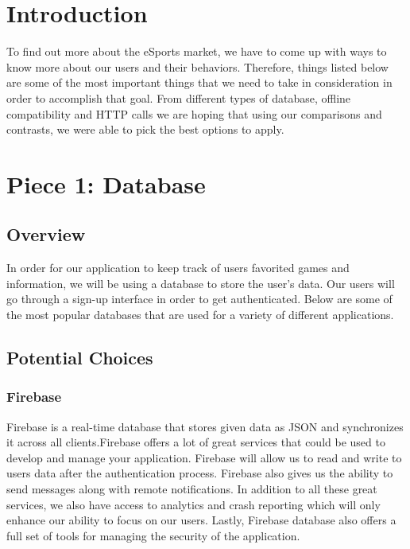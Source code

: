 \documentclass[onecolumn, draftclsnofoot,10pt, compsoc]{IEEEtran}
\begin{document}
\newpage
{}
\tableofcontents
\clearpage

\section{Introduction}
To find out more about the eSports market, we have to come up with ways to know more about our users and their behaviors. Therefore, things listed below are some of the most important things that we need to take in consideration in order to accomplish that goal. From different types of database, offline compatibility and HTTP calls we are hoping that using our comparisons and contrasts, we were able to pick the best options to apply. 

\section{Piece 1: Database}
\subsection{Overview}
In order for our application to keep track of users favorited games and information, we will be using a database to store the user's data. Our users will go through a sign-up interface in order to get authenticated. Below are some of the most popular databases that are used for a variety of different applications. 
\subsection{Potential Choices}

\subsubsection{Firebase\cite{Firebase}}
Firebase is a real-time database that stores given data as JSON and synchronizes it across all clients.Firebase offers a lot of great services that could be used to develop and manage your application. Firebase will allow us to read and write to users data after the authentication process. Firebase also gives us the ability to send messages along with remote notifications. In addition to all these great services, we also have access to analytics and crash reporting which will only enhance our ability to focus on our users. Lastly, Firebase database also offers a full set of tools for managing the security of the application.
\end{document}
